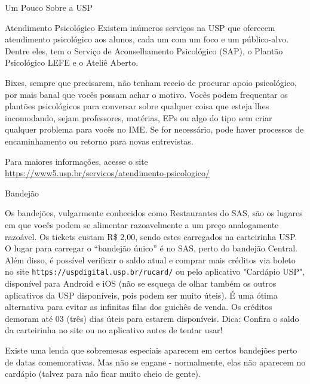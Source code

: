 \begin{secao}{Um Pouco Sobre a USP}
\begin{subsecao}{Atendimento Psicológico}
Existem inúmeros serviços na USP que oferecem atendimento psicológico
aos alunos, cada um com um foco e um público-alvo. Dentre eles, tem
o Serviço de Aconselhamento Psicológico (SAP), o Plantão Psicológico
LEFE e o Ateliê Aberto.

Bixes, sempre que precisarem, não tenham receio de procurar apoio
psicológico, por mais banal que vocês possam achar o motivo. Vocês
podem frequentar os plantões psicológicos para conversar sobre
qualquer coisa que esteja lhes incomodando, sejam professores,
matérias, EPs ou algo do tipo sem criar qualquer
problema para vocês no IME. Se for necessário, pode haver processos
de encaminhamento ou retorno para novas entrevistas.

Para maiores informações, acesse o site
\url{https://www5.usp.br/servicos/atendimento-psicologico/}

\end{subsecao}
\pagebreak

\begin{subsecao}{Bandejão}


Os bandejões, vulgarmente conhecidos como Restaurantes do SAS, são os lugares
em que vocês podem se alimentar razoavelmente a um preço analogamente razoável.
Os tickets custam R\$ 2,00, sendo estes carregados na carteirinha USP. O
lugar para carregar o ``bandejão único'' é no SAS, perto do bandejão
Central. Além disso, é possível verificar o saldo
atual e comprar mais créditos via boleto no site
{\tt https://uspdigital.usp.br/rucard/} ou pelo aplicativo "Cardápio USP",
disponível para Android e iOS (não se esqueça de olhar também os outros
aplicativos da USP disponíveis, pois podem ser muito úteis).
É uma ótima alternativa para evitar as infinitas filas dos guichês de venda. Os
créditos demoram até 03 (três) dias úteis para estarem disponíveis.
Dica: Confira o saldo da carteirinha no site ou no aplicativo antes de tentar usar!

Existe uma lenda que sobremesas especiais aparecem em certos bandejões perto de
datas comemorativas. Mas não se engane - normalmente, elas não aparecem no
cardápio (talvez para não ficar muito cheio de gente).


\end{subsecao}
\end{secao}
